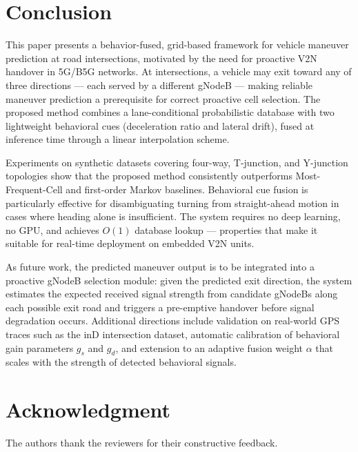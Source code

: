 \documentclass[conference]{IEEEtran}
\begin{document}
\section{Conclusion}
\label{sec:conclusion}

This paper presents a behavior-fused, grid-based framework for vehicle maneuver prediction at road intersections, motivated by the need for proactive V2N handover in 5G/B5G networks.
At intersections, a vehicle may exit toward any of three directions — each served by a different gNodeB — making reliable maneuver prediction a prerequisite for correct proactive cell selection.
The proposed method combines a lane-conditional probabilistic database with two lightweight behavioral cues (deceleration ratio and lateral drift), fused at inference time through a linear interpolation scheme.

Experiments on synthetic datasets covering four-way, T-junction, and Y-junction topologies show that the proposed method consistently outperforms Most-Frequent-Cell and first-order Markov baselines.
Behavioral cue fusion is particularly effective for disambiguating turning from straight-ahead motion in cases where heading alone is insufficient.
The system requires no deep learning, no GPU, and achieves $O(1)$ database lookup — properties that make it suitable for real-time deployment on embedded V2N units.

As future work, the predicted maneuver output is to be integrated into a proactive gNodeB selection module: given the predicted exit direction, the system estimates the expected received signal strength from candidate gNodeBs along each possible exit road and triggers a pre-emptive handover before signal degradation occurs.
Additional directions include validation on real-world GPS traces such as the inD intersection dataset, automatic calibration of behavioral gain parameters $g_s$ and $g_d$, and extension to an adaptive fusion weight $\alpha$ that scales with the strength of detected behavioral signals.

\section*{Acknowledgment}
The authors thank the reviewers for their constructive feedback.



\end{document}
